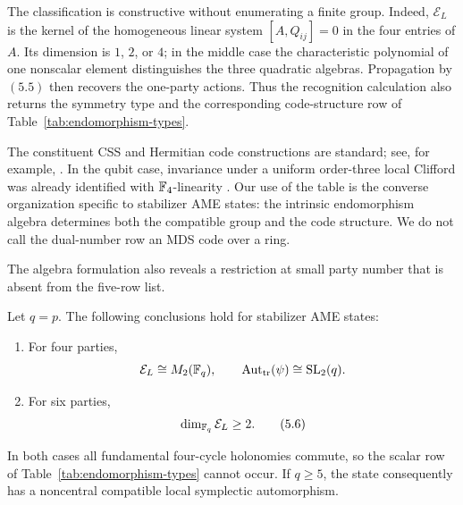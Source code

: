 The classification is constructive without enumerating a finite group.
Indeed, \(\mathcal E_L\) is the kernel of the homogeneous linear system
\([A,Q_{ij}]=0\) in the four entries of \(A\).  Its dimension is
\(1\), \(2\), or \(4\); in the middle case the characteristic polynomial
of one nonscalar element distinguishes the three quadratic algebras.
Propagation by \((5.5)\) then recovers the one-party actions.  Thus the
recognition calculation also returns the symmetry type and the corresponding
code-structure row of Table~\ref{tab:endomorphism-types}.

The constituent CSS and Hermitian code constructions are standard; see,
for example, \cite{KetkarKlappeneckerKumarSarvepalli2006}.  In the qubit
case, invariance under a uniform order-three local Clifford was already
identified with \(\mathbb F_4\)-linearity
\cite[Theorem~2]{VanDenNestDehaeneDeMoor2005}.  Our use of the table is the
converse organization specific to stabilizer AME states: the intrinsic
endomorphism algebra determines both the compatible group and the code
structure.  We do not call the dual-number row an MDS code over a ring.

The algebra formulation also reveals a restriction at small party number
that is absent from the five-row list.

\begin{theorem}
\label{thm:low-party-endomorphisms}
Let \(q=p\).  The following conclusions hold for stabilizer AME states:
\begin{enumerate}
\item For four parties,
\[
 \mathcal E_L\cong M_2(\mathbb F_q),\qquad
 \operatorname{Aut}_{\mathrm{tr}}(\psi)\cong\mathrm{SL}_2(q).
\]
\item For six parties,
\[
 \dim_{\mathbb F_q}\mathcal E_L\geq2.                         \tag{5.6}
\]
\end{enumerate}
In both cases all fundamental four-cycle holonomies commute, so the scalar
row of Table~\ref{tab:endomorphism-types} cannot occur.  If \(q\geq5\),
the state consequently has a noncentral compatible local symplectic
automorphism.
\end{theorem}

